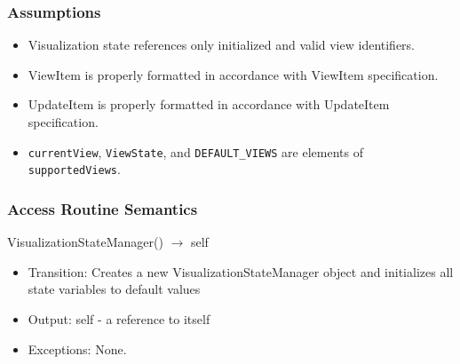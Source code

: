 \documentclass[12pt, titlepage]{article}
\begin{document}

\subsubsection{Assumptions}
\begin{itemize}
  \item Visualization state references only initialized and valid view identifiers.
  \item ViewItem is properly formatted in accordance with ViewItem specification.
  \item UpdateItem is properly formatted in accordance with UpdateItem specification.
  \item \texttt{currentView}, \texttt{ViewState}, and \texttt{DEFAULT\_VIEWS} are elements of \texttt{supportedViews}.
\end{itemize}

\subsubsection{Access Routine Semantics}
VisualizationStateManager() $\rightarrow$ self
\begin{itemize}
  \item Transition: Creates a new VisualizationStateManager object and initializes all state variables to default values
  \item Output: self - a reference to itself
  \item Exceptions: None.
\end{itemize}
\end{document}

